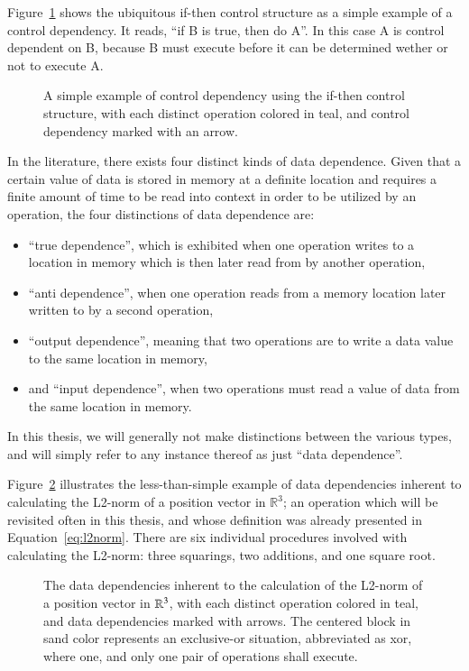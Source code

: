 Figure~\ref{fig:simpleControlDependency} shows the ubiquitous if-then control structure as a simple example of a control dependency. It reads, ``if B is true, then do A''. In this case A is control dependent on B, because B must execute before it can be determined wether or not to execute A.

\begin{figure}[ht]
	
	{\caption[If-Then Control Dependency]{A simple example of control dependency using the if-then control structure, with each distinct operation colored in teal, and control dependency marked with an arrow.}\label{fig:simpleControlDependency}}
\end{figure}

In the literature, there exists four distinct kinds of data dependence. Given that a certain value of data is stored in memory at a definite location and requires a finite amount of time to be read into context in order to be utilized by an operation, the four distinctions of data dependence are:
%
\begin{itemize}
	\item ``true dependence'', which is exhibited when one operation writes to a location in memory which is then later read from by another operation,
	\item ``anti dependence'', when one operation reads from a memory location later written to by a second operation,
	\item ``output dependence'', meaning that two operations are to write a data value to the same location in memory,
	\item and ``input dependence'', when two operations must read a value of data from the same location in memory.
\end{itemize}
%
In this thesis, we will generally not make distinctions between the various types, and will simply refer to any instance thereof as just ``data dependence''.

Figure~\ref{fig:dataDependencyOfL2Norm} illustrates the less-than-simple example of data dependencies inherent to calculating the L2-norm of a position vector in $\mathbb{R}^{3}$; an operation which will be revisited often in this thesis, and whose definition was already presented in Equation~\ref{eq:l2norm}. There are six individual procedures involved with calculating the L2-norm: three squarings, two additions, and one square root.

\begin{figure}[ht]
	
	{\caption[Data Dependencies in the L2-norm Calculation]{The data dependencies inherent to the calculation of the L2-norm of a position vector in $\mathbb{R}^{3}$, with each distinct operation colored in teal, and data dependencies marked with arrows. The centered block in sand color represents an exclusive-or situation, abbreviated as xor, where one, and only one pair of operations shall execute.}\label{fig:dataDependencyOfL2Norm}}
\end{figure}

